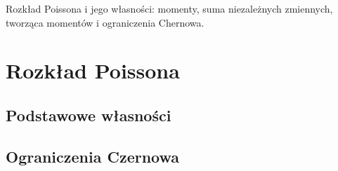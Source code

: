 {
\makeatletter
{}
\makeatother
\graphicspath{{../probabil}}

\begin{questiontext}
	Rozkład Poissona i jego własności: momenty, suma niezależnych zmiennych, tworząca momentów i ograniczenia Chernowa.
\end{questiontext}

\section{Rozkład Poissona}
\subsection{Podstawowe własności}
{
}
\subsection{Ograniczenia Czernowa}

}
